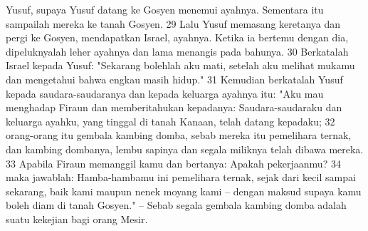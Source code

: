 \begin{biblechapter}
Yusuf, supaya Yusuf datang ke Gosyen menemui ayahnya. Sementara itu sampailah mereka ke tanah Gosyen. 29 Lalu Yusuf memasang keretanya dan pergi ke Gosyen, mendapatkan Israel, ayahnya. Ketika ia bertemu dengan dia, dipeluknyalah leher ayahnya dan lama menangis pada bahunya. 30 Berkatalah Israel kepada Yusuf: "Sekarang bolehlah aku mati, setelah aku melihat mukamu dan mengetahui bahwa engkau masih hidup." 31 Kemudian berkatalah Yusuf kepada saudara-saudaranya dan kepada keluarga ayahnya itu: "Aku mau menghadap Firaun dan memberitahukan kepadanya: Saudara-saudaraku dan keluarga ayahku, yang tinggal di tanah Kanaan, telah datang kepadaku; 32 orang-orang itu gembala kambing domba, sebab mereka itu pemelihara ternak, dan kambing dombanya, lembu sapinya dan segala miliknya telah dibawa mereka. 33 Apabila Firaun memanggil kamu dan bertanya: Apakah pekerjaanmu? 34 maka jawablah: Hamba-hambamu ini pemelihara ternak, sejak dari kecil sampai sekarang, baik kami maupun nenek moyang kami -- dengan maksud supaya kamu boleh diam di tanah Gosyen." -- Sebab segala gembala kambing domba adalah suatu kekejian bagi orang Mesir.
\end{biblechapter}

